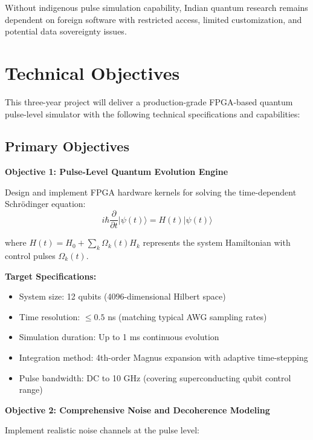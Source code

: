 \documentclass[12pt,a4paper]{article}
\begin{document}
Without indigenous pulse simulation capability, Indian quantum research remains dependent on foreign software with restricted access, limited customization, and potential data sovereignty issues.

\newpage

\section{Technical Objectives}

This three-year project will deliver a production-grade FPGA-based quantum pulse-level simulator with the following technical specifications and capabilities:

\subsection{Primary Objectives}

\textbf{Objective 1: Pulse-Level Quantum Evolution Engine}

Design and implement FPGA hardware kernels for solving the time-dependent Schrödinger equation:
\begin{equation}
i\hbar \frac{\partial}{\partial t}|\psi(t)\rangle = H(t)|\psi(t)\rangle
\end{equation}

where $H(t) = H_0 + \sum_k \Omega_k(t) H_k$ represents the system Hamiltonian with control pulses $\Omega_k(t)$.

\textbf{Target Specifications:}
\begin{itemize}[noitemsep]
\item System size: 12 qubits (4096-dimensional Hilbert space)
\item Time resolution: $\leq 0.5$ ns (matching typical AWG sampling rates)
\item Simulation duration: Up to 1 ms continuous evolution
\item Integration method: 4th-order Magnus expansion with adaptive time-stepping
\item Pulse bandwidth: DC to 10 GHz (covering superconducting qubit control range)
\end{itemize}

\textbf{Objective 2: Comprehensive Noise and Decoherence Modeling}

Implement realistic noise channels at the pulse level:
\end{document}
